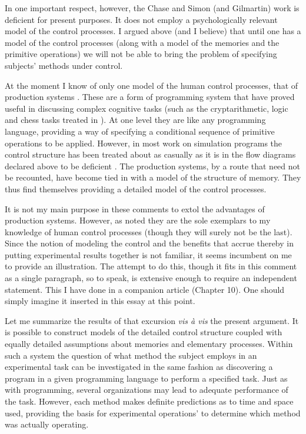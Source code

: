 \documentclass{paper}
\newcounter{oldpagecounter}
\newcommand\oldpage{\stepcounter{oldpagecounter}\marginpar{\footnotesize{\textcolor{mygrey}{pg. \arabic{oldpagecounter}}}}}
\begin{document}
In one important respect, however, the Chase and Simon (and Gilmartin) work is deficient for present purposes. It does not employ a psychologically relevant model of the control processes. I argued above (and I believe) that until one has a model of the control processes (along with a model of the memories and the primitive operations) we will not be able to bring the problem of specifying subjects' methods under control.

At the moment I know of only one model of the human control processes, that of production systems \citep{NewellSimon1972, Newell1972}. These are a form of programming system that have proved useful in discussing complex cognitive tasks (such as the cryptarithmetic, logic and chess tasks treated in \citealt{NewellSimon1972}). At one level they are like any programming language, providing a way of specifying a conditional sequence of primitive operations to be applied. However, in most work on simulation programs the control structure has been treated about as casually as it is in the flow diagrams declared above to be deficient \citep[see for instance]{Johnson1964}. The production systems, by a route that need not be recounted, have become tied in with a model of the structure of memory. They \oldpage thus find themselves providing a detailed model of the control processes.

It is not my main purpose in these comments to extol the advantages of production systems. However, as noted they are the sole exemplars to my knowledge of human control processes (though they will surely not be the last). Since the notion of modeling the control and the benefits that accrue thereby in putting experimental results together is not familiar, it seems incumbent on me to provide an illustration. The attempt to do this, though it fits in this comment as a single paragraph, so to speak, is extensive enough to require an independent statement. This I have done in a companion article (Chapter 10). One should simply imagine it inserted in this essay at this point.

Let me summarize the results of that excursion \textit{vis \`{a} vis} the present argument. It is possible to construct models of the detailed control structure coupled with equally detailed assumptions about memories and elementary processes. Within such a system the question of what method the subject employs in an experimental task can be investigated in the same fashion as discovering a program in a given programming language to perform a specified task. Just as with programming, several organizations may lead to adequate performance of the task. However, each method makes definite predictions as to time and space used, providing the basis for experimental operations' to determine which method was actually operating.
\end{document}

